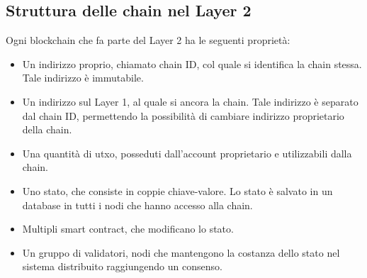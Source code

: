 \documentclass[12pt,a4paper,openright,twoside]{report}
\begin{document}
\subsection{Struttura delle chain nel Layer 2}
Ogni blockchain che fa parte del Layer 2 ha le seguenti proprietà:
\begin{itemize}
    \item Un indirizzo proprio, chiamato chain ID, col quale si identifica la chain stessa. Tale indirizzo è immutabile.
    \item Un indirizzo sul Layer 1, al quale si ancora la chain. Tale indirizzo è separato dal chain ID, permettendo la possibilità di cambiare indirizzo proprietario della chain.
    \item Una quantità di \acrshort{utxo}, posseduti dall'account proprietario e utilizzabili dalla chain.
    \item Uno stato, che consiste in coppie chiave-valore. Lo stato è salvato in un database in tutti i nodi che hanno accesso alla chain.
    \item Multipli smart contract, che modificano lo stato.
    \item Un gruppo di validatori, nodi che mantengono la costanza dello stato nel sistema distribuito raggiungendo un consenso.
\end{itemize}
\end{document}
